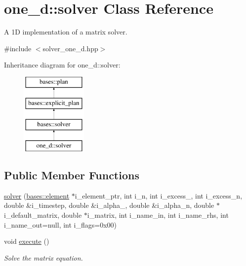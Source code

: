 \hypertarget{classone__d_1_1solver}{\section{one\-\_\-d\-:\-:solver Class Reference}
\label{classone__d_1_1solver}
}


A 1\-D implementation of a matrix solver.  




{\ttfamily \#include $<$solver\-\_\-one\-\_\-d.\-hpp$>$}

Inheritance diagram for one\-\_\-d\-:\-:solver\-:\begin{figure}[H]
\begin{center}
\leavevmode
\includegraphics[height=4.000000cm]{classone__d_1_1solver}
\end{center}
\end{figure}
\subsection*{Public Member Functions}
\begin{DoxyCompactItemize}
\item 
\hyperlink{classone__d_1_1solver_a17c2b3e1be15e2311ac36de12cfb877b}{solver} (\hyperlink{classbases_1_1element}{bases\-::element} $\ast$i\-\_\-element\-\_\-ptr, int i\-\_\-n, int i\-\_\-excess\-\_, int i\-\_\-excess\-\_\-n, double \&i\-\_\-timestep, double \&i\-\_\-alpha\-\_, double \&i\-\_\-alpha\-\_\-n, double $\ast$i\-\_\-default\-\_\-matrix, double $\ast$i\-\_\-matrix, int i\-\_\-name\-\_\-in, int i\-\_\-name\-\_\-rhs, int i\-\_\-name\-\_\-out=null, int i\-\_\-flags=0x00)
\begin{DoxyCompactList}\small\item\em \end{DoxyCompactList}\item 
void \hyperlink{classone__d_1_1solver_a7c28bd733cb3c3849afe1773974eb4f6}{execute} ()
\begin{DoxyCompactList}\small\item\em Solve the matrix equation. \end{DoxyCompactList}\end{DoxyCompactItemize}
